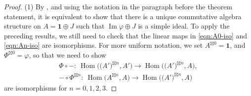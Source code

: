 \documentclass[pdftex]{sigma}
\numberwithin{equation}{section}
\theoremstyle{definition}
\begin{document}
\begin{proof}
(1) By \cite{HKL}, and using the notation in the paragraph before the theorem statement, it is equivalent to show that there is a unique commutative algebra structure on $A=\mathbf{1}\oplus J$ such that $\operatorname{Im} \varphi\oplus J$ is a simple ideal. To apply the preceding results, we still need to check that the linear maps in \eqref{eqn:A0-iso} and \eqref{eqn:An-iso} are isomorphisms. For more uniform notation, we set $A^{\boxtimes 0}=\mathbf{1}$,  and $\Phi^{\boxtimes 0} =\varphi$, so that we need to show
\begin{gather*}
\Phi\circ -\colon\ \operatorname{Hom}\bigl(\bigl(A'\bigr)^{\boxtimes n},A'\bigr)\longrightarrow\operatorname{Hom}\bigl(\bigl(A'\bigr)^{\boxtimes n},A\bigr),\\ -\circ\Phi^{\boxtimes n}\colon\ \operatorname{Hom}\bigl(A^{\boxtimes n},A\bigr)\longrightarrow\operatorname{Hom}\bigl(\bigl(A'\bigr)^{\boxtimes n},A\bigr)
\end{gather*}
are isomorphisms for $n=0,1,2,3$.


\end{proof}
\end{document}
